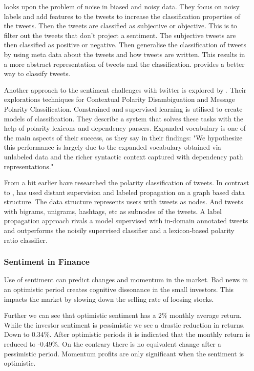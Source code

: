 \cite[]{barbosa10} looks upon the problem of noise in biased and noisy data. 
They focus on noisy labels and add features to the tweets to increase the
classification properties of the tweets. Then the tweets are classified as
subjective or objective. This is to filter out the tweets that don't project a
sentiment. The subjective tweets are then classified as positive or negative.
Then \cite[]{barbosa10} generalise the classification of tweets by using meta
data about the tweets and how tweets are written. This results in a more
abstract representation of tweets and the classification. \cite[]{barbosa10}
provides a better way to classify tweets.

Another approach to the sentiment challenges with twitter is explored by
\cite[]{becker13}. Their explorations techniques for Contextual Polarity Disambiguation
and Message Polarity Classification. Constrained and supervised learning is
utilised to create models of classification. They describe a system that solves
these tasks with the help of polarity lexicons and dependency parsers. 
Expanded vocabulary is one of the main aspects of their success, as they say in
their findings: "We hypothesize this performance is largely due to the expanded vocabulary
obtained via unlabeled data and the richer syntactic context captured with
dependency path representations." \cite[]{becker13}

From a bit earlier \cite[]{sperious11} have researched the polarity classification of tweets. 
In contrast to \cite[]{becker13}, \cite[]{sperious11} has used distant
supervision and labeled propagation on a graph based data structure. The data
structure represents users with tweets as nodes. And tweets with bigrams,
unigrams, hashtags, etc as subnodes of the tweets. A label propagation approach
rivals a model supervised with in-domain annotated tweets and outperforms the
noisily supervised classifier and a lexicon-based polarity ratio classifier.
\cite[]{sperious11} 

\subsubsection{Sentiment in Finance}

Use of sentiment can predict changes and momentum in the market.
Bad news in an optimistic period creates cognitive dissonance in the small
investors. This impacts the market by slowing down the selling rate of loosing
stocks. \cite[p29]{doukas10:sentiment_and_momentum}

Further we can see that optimistic sentiment has a 2\% monthly average return.
While the investor sentiment is pessimistic we see a drastic reduction in
returns. Down to 0.34\%.\cite[p5]{doukas10:sentiment_and_momentum}
After optimistic periods it is indicated that the monthly return is reduced to
-0.49\%. On the contrary there is no equivalent change after a pessimistic
period. \cite[p6-7]{doukas10:sentiment_and_momentum}
Momentum profits are only significant when the sentiment is optimistic.
\cite[p29]{doukas10:sentiment_and_momentum}

